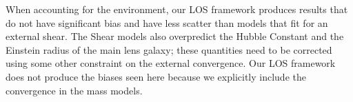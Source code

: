When accounting for the environment, our LOS framework produces results that do not have significant bias and have less scatter than models that fit for an external shear. The Shear models also overpredict the Hubble Constant and the Einstein radius of the main lens galaxy; these quantities need to be corrected using some other constraint on the external convergence. Our LOS framework does not produce the biases seen here because we explicitly include the convergence in the mass models.